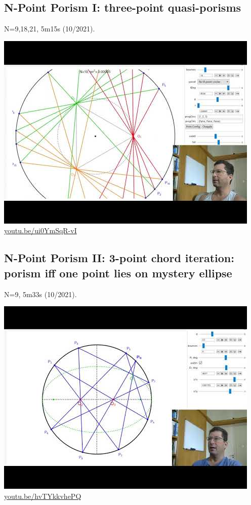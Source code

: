 \documentclass[12pt]{amsart}
\begin{document}
\subsection{N-Point Porism I: three-point quasi-porisms}
\label{vid:ui0YmSqR-vI}
\noindent N=9,18,21, 5m15s (10/2021). 
\begin{center}\includegraphics[width=.5\textwidth]{pics/ui0YmSqR-vI.jpg} \\ 
\href{https://youtu.be/ui0YmSqR-vI}{\url{youtu.be/ui0YmSqR-vI}}\end{center}
% 
\subsection{N-Point Porism II: 3-point chord iteration: porism iff one point lies on mystery ellipse}
\label{vid:hvTYkkvhePQ}
\noindent N=9, 5m33s (10/2021). 
\begin{center}\includegraphics[width=.5\textwidth]{pics/hvTYkkvhePQ.jpg} \\ 
\href{https://youtu.be/hvTYkkvhePQ}{\url{youtu.be/hvTYkkvhePQ}}\end{center}
% 
\end{document}
